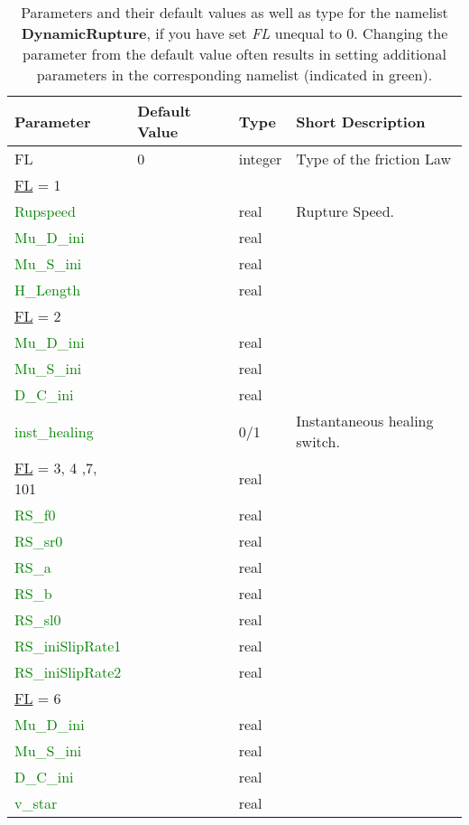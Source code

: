 \documentclass[12pt,twoside]{article}
\begin{document}
\begin{table}[H]
\caption{Parameters and their default values as well as type for the namelist \textbf{DynamicRupture},
         if you have set \textit{FL} unequal to 0.
         Changing the parameter from the default value often results in setting additional parameters
         in the corresponding namelist (indicated in green).}
\begin{center}
\begin{tabular}{|p{4.8cm}|p{2.4cm}|p{2cm}|p{5cm}|}
\hline
Parameter & Default Value & Type & Short Description \\
\hline
\hline
FL & 0 & integer & Type of the friction Law\\
\hdashline
\uline{FL} = 1 & & &\\
\textcolor{green}{Rupspeed} & & real & Rupture Speed. \\
\textcolor{green}{Mu\_D\_ini} & &  real & \\
\textcolor{green}{Mu\_S\_ini} & &  real & \\
\textcolor{green}{H\_Length} & & real  & \\
\hdashline
\uline{FL} = 2 & & &\\
\textcolor{green}{Mu\_D\_ini} & & real  & \\
\textcolor{green}{Mu\_S\_ini} & & real  & \\
\textcolor{green}{D\_C\_ini} & &  real & \\
\textcolor{green}{inst\_healing} & & 0/1 & Instantaneous healing switch. \\
\hdashline
\uline{FL} = 3, 4 ,7, 101 & &real  &\\
\textcolor{green}{RS\_f0} & &  real & \\
\textcolor{green}{RS\_sr0} & & real  & \\
\textcolor{green}{RS\_a} & &  real & \\
\textcolor{green}{RS\_b} & &  real & \\
\textcolor{green}{RS\_sl0} & & real  & \\
\textcolor{green}{RS\_iniSlipRate1} & &  real & \\
\textcolor{green}{RS\_iniSlipRate2} & & real  & \\
\hdashline
\uline{FL} = 6 & & &\\
\textcolor{green}{Mu\_D\_ini} & & real & \\
\textcolor{green}{Mu\_S\_ini} & &real  & \\
\textcolor{green}{D\_C\_ini} & & real & \\
\textcolor{green}{v\_star} & & real & \\

\end{tabular}
\end{center}
\end{table}
\end{document}
